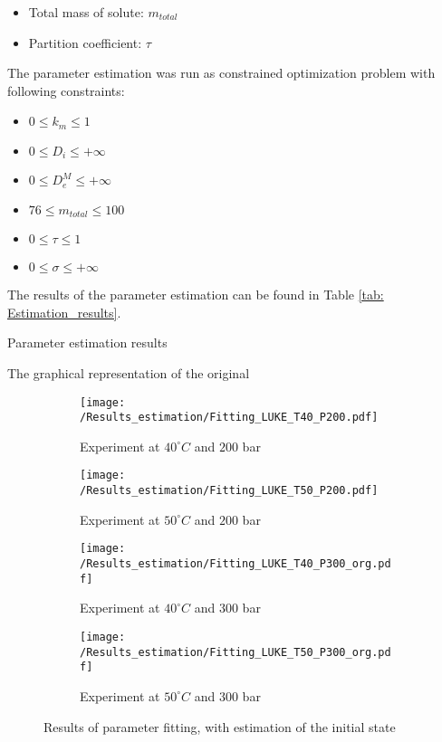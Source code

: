 \documentclass[../Article_Model_Parameters.tex]{subfiles}
\begin{document}
    \begin{itemize}
        \item Total mass of solute: \qquad\qquad\quad$m_{total}$
        \item Partition coefficient: \qquad\qquad\quad$\tau$
    \end{itemize}

	The parameter estimation was run as constrained optimization problem with following constraints:
	
	\begin{itemize}
		\item $0  \leq k_m   \leq 1$
		\item $0  \leq D_i   \leq +\infty$
		\item $0  \leq D_e^M \leq +\infty$
		\item $76 \leq m_{total} \leq 100$
		\item $0  \leq \tau \leq 1$
		\item $0  \leq \sigma \leq +\infty$
	\end{itemize}

	The results of the parameter estimation can be found in Table \ref{tab: Estimation_results}.
		
	\begin{table}[H]
		\centering
		\caption{Parameter estimation results}
		\label{tab: Estimation_results}
	\end{table}
	
	The graphical representation of the original

	\begin{figure*}[!h]
		\centering
		\begin{subfigure}[b]{0.8\textwidth}
			\centering
			\texttt{[image: /Results\_estimation/Fitting\_LUKE\_T40\_P200.pdf]}
			\caption{Experiment at $40^\circ C$ and $200$ bar}
		\end{subfigure}
		\hfill
		\begin{subfigure}[b]{0.8\textwidth}
			\centering
			\texttt{[image: /Results\_estimation/Fitting\_LUKE\_T50\_P200.pdf]}
			\caption{Experiment at $50^\circ C$ and $200$ bar}
		\end{subfigure}
		\hfill
		\begin{subfigure}[b]{0.8\textwidth}
			\centering
			\texttt{[image: /Results\_estimation/Fitting\_LUKE\_T40\_P300\_org.pdf]}
			\caption{Experiment at $40^\circ C$ and $300$ bar}
		\end{subfigure}
		\hfill
		\begin{subfigure}[b]{0.8\textwidth}
			\centering
			\texttt{[image: /Results\_estimation/Fitting\_LUKE\_T50\_P300\_org.pdf]}
			\caption{Experiment at $50^\circ C$ and $300$ bar}
		\end{subfigure}
		\caption{Results of parameter fitting, with estimation of the initial state}
	\end{figure*}
\end{document}
